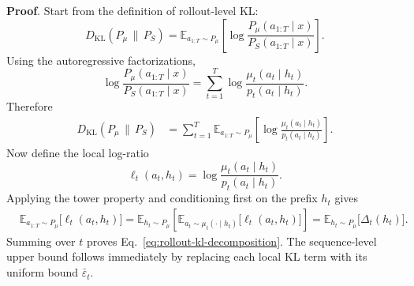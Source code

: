 \documentclass{llmxive}
\providecommand{\paragraph}[1]{\vspace{1mm}\noindent\textbf{#1}.}
\begin{document}
\paragraph{Proof}
Start from the definition of rollout-level KL:
\begin{equation*}
D_{\mathrm{KL}}(P_{\mu}\,\|\,P_S)
=
\mathbb{E}_{a_{1:T}\sim P_{\mu}}
\left[
\log \frac{P_{\mu}(a_{1:T}\mid x)}{P_S(a_{1:T}\mid x)}
\right].
\end{equation*}
Using the autoregressive factorizations,
\begin{equation*}
\log \frac{P_{\mu}(a_{1:T}\mid x)}{P_S(a_{1:T}\mid x)}
=
\sum_{t=1}^T
\log \frac{\mu_t(a_t\mid h_t)}{p_t(a_t\mid h_t)}.
\end{equation*}
Therefore
\begin{align*}
D_{\mathrm{KL}}(P_{\mu}\,\|\,P_S)
&=
\sum_{t=1}^T
\mathbb{E}_{a_{1:T}\sim P_{\mu}}
\left[
\log \frac{\mu_t(a_t\mid h_t)}{p_t(a_t\mid h_t)}
\right].
\end{align*}
Now define the local log-ratio
\[
\ell_t(a_t,h_t)
=
\log \frac{\mu_t(a_t\mid h_t)}{p_t(a_t\mid h_t)}.
\]
Applying the tower property and conditioning first on the prefix $h_t$ gives
\begin{align*}
&\mathbb{E}_{a_{1:T}\sim P_{\mu}}
\bigl[\ell_t(a_t,h_t)\bigr]
=\mathbb{E}_{h_t\sim P_{\mu}}
\left[
\mathbb{E}_{a_t\sim \mu_t(\cdot\mid h_t)}
\bigl[\ell_t(a_t,h_t)\bigr]
\right] =
\mathbb{E}_{h_t\sim P_{\mu}}
\bigl[\Delta_t(h_t)\bigr].
\end{align*}
Summing over $t$ proves Eq.~\ref{eq:rollout-kl-decomposition}.
The sequence-level upper bound follows immediately by replacing each local KL term with its uniform bound $\bar\varepsilon_t$.
\end{document}
